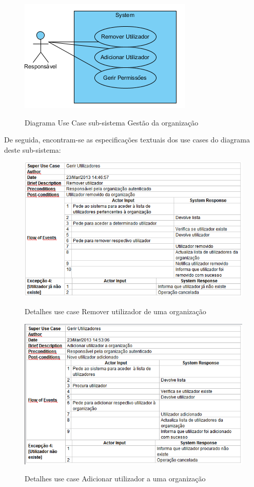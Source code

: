 \documentclass[12pt,a4paper]{article}
\begin{document}
\begin{figure}[h!]
\centering
\includegraphics[scale=1]{usecase/R_GerirUtilizadores}
\label{usecase}
\caption{Diagrama Use Case sub-sistema Gestão da organização}
\end{figure}

De seguida, encontram-se as especificações textuais dos use cases do diagrama deste sub-sistema:\\

\begin{figure}[h!]
\centering
\includegraphics[scale=0.7]{d_usecase/removerutilizador}
\label{usecase}
\caption{Detalhes use case Remover utilizador de uma organização}
\end{figure}

\begin{figure}[h!]
\centering
\includegraphics[scale=0.7]{d_usecase/adicionarutilizador}
\label{usecase}
\caption{Detalhes use case Adicionar utilizador a uma organização}
\end{figure}
\end{document}
